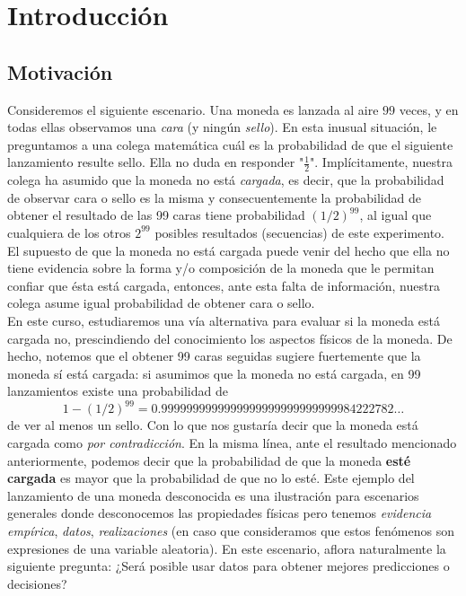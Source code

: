 \chapter{Introducción}

\section{Motivación}

Consideremos el siguiente escenario. Una moneda es lanzada al aire $99$ veces, y en todas ellas observamos una \emph{cara} (y ningún  \emph{sello}). En esta inusual situación, le preguntamos a una colega matemática cuál es la probabilidad de que el siguiente lanzamiento resulte sello. Ella no duda en responder "$\frac{1}{2}$".  Implícitamente, nuestra colega ha asumido que la moneda no está \emph{cargada}, es decir, que la probabilidad de observar cara o sello es la misma y consecuentemente la probabilidad de obtener el resultado de las 99 caras tiene probabilidad $(1/2)
^{99}$, al igual que cualquiera de los otros $2^{99}$ posibles resultados (secuencias) de este experimento. El supuesto de que la moneda no está cargada puede venir del hecho que ella no tiene evidencia sobre la forma y/o composición de la moneda que le permitan confiar que ésta está cargada, entonces, ante esta falta de información, nuestra colega asume igual probabilidad de obtener cara o sello. \\

En este curso, estudiaremos una vía alternativa para evaluar si la moneda está cargada no, prescindiendo del conocimiento los aspectos físicos de la moneda. De hecho, notemos que el obtener 99 caras seguidas sugiere fuertemente que la moneda sí está  cargada: si asumimos que la moneda no está cargada, en 99 lanzamientos existe una probabilidad de 
\[1-(1/2)
^{99} = 0.9999999999999999999999999999984222782\ldots\]
de ver al menos un sello. Con lo que nos gustaría decir que la moneda está cargada como \emph{por contradicción}. En la misma línea, ante el resultado mencionado anteriormente, podemos decir que la probabilidad de que la moneda \textbf{esté cargada} es mayor que la probabilidad de que no lo esté. Este ejemplo del lanzamiento de una moneda desconocida es una ilustración para escenarios generales donde desconocemos las propiedades físicas pero tenemos \emph{evidencia empírica}, \emph{datos}, \emph{realizaciones} (en caso que consideramos que estos fenómenos son expresiones de una variable aleatoria). En este escenario, aflora naturalmente la siguiente pregunta: ¿Será posible usar datos para obtener mejores predicciones o decisiones?\\

